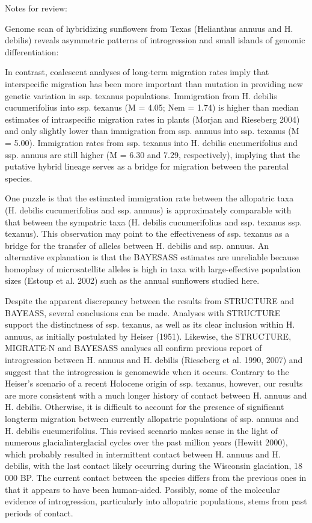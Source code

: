 \documentclass[11pt]{article}
\begin{document}
\begin{enumerate}
Notes for review:

Genome scan of hybridizing sunflowers from Texas
(Helianthus annuus and H. debilis) reveals asymmetric
patterns of introgression and small islands of genomic
differentiation:

In contrast, coalescent analyses of long-term migration
rates imply that interspecific migration has been
more important than mutation in providing new genetic
variation in ssp. texanus populations. Immigration from
H. debilis cucumerifolius into ssp. texanus (M = 4.05;
Nem = 1.74) is higher than median estimates of intraspecific
migration rates in plants (Morjan and Rieseberg 2004) 
and only slightly lower than immigration from
ssp. annuus into ssp. texanus (M = 5.00). Immigration
rates from ssp. texanus into H. debilis cucumerifolius and
ssp. annuus are still higher (M = 6.30 and 7.29, respectively),
implying that the putative hybrid lineage serves
as a bridge for migration between the parental species.

One puzzle is
that the estimated immigration rate between the allopatric
taxa (H. debilis cucumerifolius and ssp. annuus) is
approximately comparable with that between the sympatric
taxa (H. debilis cucumerifolius and ssp. texanus ssp.
texanus). This observation may point to the effectiveness
of ssp. texanus as a bridge for the transfer of alleles
between H. debilis and ssp. annuus. An alternative explanation
is that the BAYESASS estimates are unreliable
because homoplasy of microsatellite alleles is high in
taxa with large-effective population sizes (Estoup et al.
2002) such as the annual sunflowers studied here.

Despite the apparent discrepancy between the results
from STRUCTURE and BAYEASS, several conclusions
can be made. Analyses with STRUCTURE support the
distinctness of ssp. texanus, as well as its clear inclusion
within H. annuus, as initially postulated by Heiser (1951).
Likewise, the STRUCTURE, MIGRATE-N and BAYESASS
analyses all confirm previous report of introgression
between H. annuus and H. debilis (Rieseberg et al.
1990, 2007) and suggest that the introgression is genomewide
when it occurs. Contrary to the Heiser’s scenario of
a recent Holocene origin of ssp. texanus, however, our
results are more consistent with a much longer history of
contact between H. annuus and H. debilis. Otherwise, it is
difficult to account for the presence of significant longterm
migration between currently allopatric populations
of ssp. annuus and H. debilis cucumerifolius. This revised
scenario makes sense in the light of numerous glacialinterglacial
cycles over the past million years (Hewitt
2000), which probably resulted in intermittent contact
between H. annuus and H. debilis, with the last contact
likely occurring during the Wisconsin glaciation,
18 000 BP. The current contact between the species differs
from the previous ones in that it appears to have been
human-aided. Possibly, some of the molecular evidence
of introgression, particularly into allopatric populations,
stems from past periods of contact.


\end{enumerate}
\end{document}
